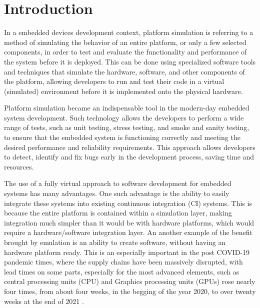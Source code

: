 
\chapter{Introduction}

In a embedded devices development context, platform simulation is referring to a method of simulating 
the behavior of an entire platform, or only a few selected components, in order to test and evaluate
the functionality and performance of the system before it is deployed. This can be done using specialized
software tools and techniques that simulate the hardware, software, and other components of the platform,
allowing developers to run and test their code in a virtual (simulated) environment before it is implemented
onto the physical hardware.

Platform simulation became an indispensable tool in the modern-day embedded system development. Such technology
allows the developers to perform a wide range of tests, such as unit testing, stress testing, and smoke and sanity
testing, to ensure that the embedded system is functioning correctly and meeting the desired performance and 
reliability requirements. This approach allows developers to detect, identify and fix bugs early in the development
process, saving time and resources.

The use of a fully virtual approach to software development for embedded systems has many advantages.
One such advantage is the ability to easily integrate these systems into existing continuous integration (CI) systems.
This is because the entire platform is contained within a simulation layer, making integration much simpler than it
would be with hardware platforms, which would require a hardware/software integration layer. An another example of
the benefit brought by emulation is an ability to create software, without having an hardware platform ready.
This is an especially important in the post COVID-19 pandemic times, where the supply chains have been massively
disrupted, with lead times on some parts, especially for the most advanced elements, such as central processing units
(CPU) and Graphics processing units (GPUs) rose nearly four times, from about four weeks, in the begging of the year 2020,
to over twenty weeks at the end of 2021 \cite{Covid19-AUTOMOTIVE} \cite{Covid19-LEAD-TIME} 
\cite{Covid19-LEAD-TIME-BLOOMBERG}.

